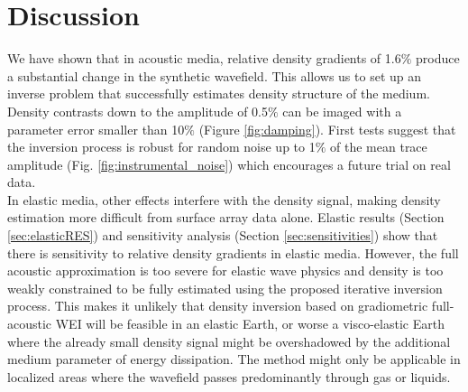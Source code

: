 \documentclass[]{article}
\begin{document}

	\section{Discussion}
	We have shown that in acoustic media, relative density gradients of 1.6$\%$ produce a substantial change in the synthetic wavefield. This allows us to set up an inverse problem that successfully estimates density structure of the medium. Density contrasts down to the amplitude of  0.5$\%$ can be imaged with a parameter error smaller than 10$\%$ (Figure \ref{fig:damping}). First tests suggest that the inversion process is robust for random noise up to 1$\%$ of the mean trace amplitude (Fig. \ref{fig:instrumental_noise}) which encourages a future trial on real data.\\
	
	In elastic media, other effects interfere with the density signal, making density estimation more difficult from surface array data alone. Elastic results (Section \ref{sec:elasticRES}) and sensitivity analysis (Section \ref{sec:sensitivities}) show that there is sensitivity to relative density gradients in elastic media. However, the full acoustic approximation is too severe for elastic wave physics and density is too weakly constrained to be fully estimated using the proposed iterative inversion process. This makes it unlikely that density inversion based on gradiometric full-acoustic WEI will be feasible in an elastic Earth, or worse a visco-elastic Earth where the already small density signal might be overshadowed by the additional medium parameter of energy dissipation. The method might only be applicable in localized areas where the wavefield passes predominantly through gas or liquids.\\
	
\end{document}
